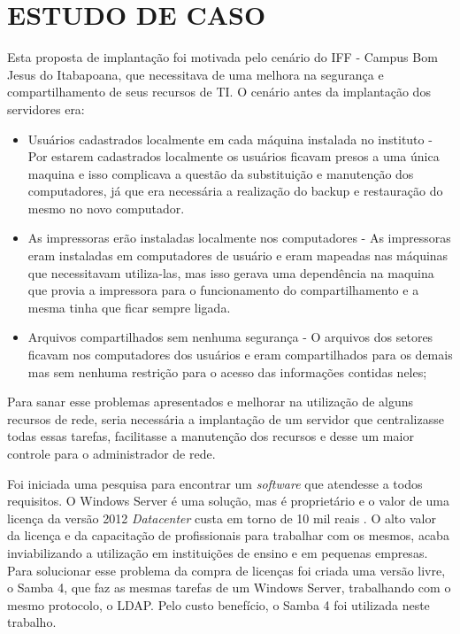 \chapter{ESTUDO DE CASO}

Esta proposta de implantação foi motivada pelo cenário do IFF - Campus Bom Jesus do Itabapoana, que necessitava de uma melhora na segurança e compartilhamento de seus recursos de TI. O cenário antes da implantação dos servidores era:

\begin{itemize}
 	\item {Usuários cadastrados localmente em cada máquina instalada no instituto} - Por estarem cadastrados localmente os usuários ficavam presos a uma única maquina e isso complicava a questão da substituição e manutenção dos computadores, já que era necessária a realização do backup e restauração do mesmo no novo computador.
	\item {As impressoras erão instaladas localmente nos computadores} - As impressoras eram instaladas em computadores de usuário e eram mapeadas nas  máquinas que necessitavam utiliza-las, mas isso gerava uma dependência na maquina que provia a impressora para o funcionamento do compartilhamento e a mesma tinha que ficar sempre ligada.
	\item {Arquivos compartilhados sem nenhuma segurança} - O arquivos dos setores ficavam nos computadores dos usuários e eram compartilhados para os demais mas sem nenhuma restrição para o acesso das informações contidas neles;
\end{itemize}

 Para sanar esse problemas apresentados e melhorar na utilização de alguns recursos de rede, seria necessária a implantação de um servidor que centralizasse todas essas tarefas, facilitasse a manutenção dos recursos e desse um maior controle para o administrador de rede.

Foi iniciada uma pesquisa para encontrar um \textit{software} que atendesse a todos requisitos. O Windows Server é uma solução, mas é proprietário e o valor de uma licença da versão 2012 \textit{Datacenter} custa em torno de 10 mil reais \cite{SERVER}. O alto valor da licença  e da capacitação de profissionais para trabalhar com os mesmos, acaba inviabilizando a utilização em instituições de ensino e em pequenas empresas. 
Para solucionar esse problema da compra de licenças foi criada uma versão livre, o Samba 4, que faz as mesmas tarefas de um Windows Server, trabalhando com o mesmo protocolo, o LDAP. Pelo custo benefício, o Samba 4 foi utilizada neste trabalho.

